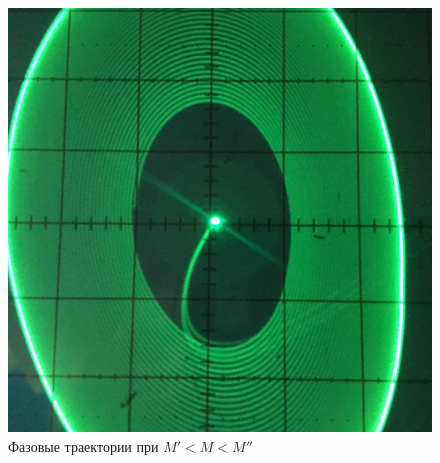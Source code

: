\begin{figure}[h]
\begin{minipage}{0.32\linewidth}
	\end{minipage}
	\begin{minipage}{0.32\linewidth}
	\includegraphics[width=\linewidth]{photo/task2c(midL).jpg}
	\end{minipage}
	\caption{Фазовые траектории при $M'<M<M''$}
	\label{fig10}
\end{figure}
\vspace{-30pt}
